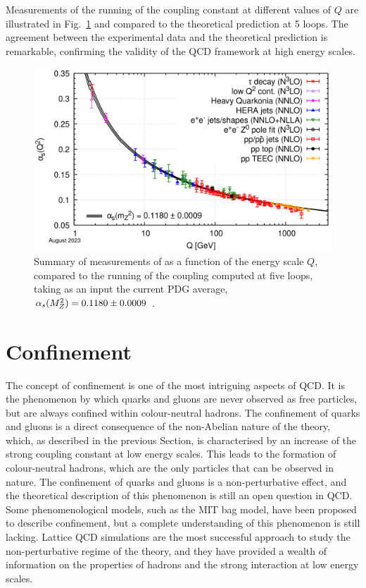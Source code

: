 Measurements of the running of the coupling constant at different values of $Q$ are illustrated in Fig.~\ref{fig:alpha_s_running} and compared to the theoretical prediction at 5 loops. The agreement between the experimental data and the theoretical prediction is remarkable, confirming the validity of the QCD framework at high energy scales.


\begin{figure}[htb]
    \centering
    \includegraphics[width=0.7\linewidth]{Figures/Chapter 1/Alpha_s_running.png}
    \caption{Summary of measurements of \als as a function of the energy scale $Q$, compared to the running of the coupling computed at five loops, taking as an input the current PDG average, $\alpha_s(M_Z^2) = 0.1180 \pm 0.0009$ \gevcc.}
    \label{fig:alpha_s_running}
\end{figure}

\section{Confinement}
The concept of confinement is one of the most intriguing aspects of QCD. It is the phenomenon by which quarks and gluons are never observed as free particles, but are always confined within colour-neutral hadrons. The confinement of quarks and gluons is a direct consequence of the non-Abelian nature of the theory, which, as described in the previous Section, is characterised by an increase of the strong coupling constant at low energy scales. This leads to the formation of colour-neutral hadrons, which are the only particles that can be observed in nature. The confinement of quarks and gluons is a non-perturbative effect, and the theoretical description of this phenomenon is still an open question in QCD. Some phenomenological models, such as the MIT bag model, have been proposed to describe confinement, but a complete understanding of this phenomenon is still lacking. Lattice QCD simulations are the most successful approach to study the non-perturbative regime of the theory, and they have provided a wealth of information on the properties of hadrons and the strong interaction at low energy scales.

